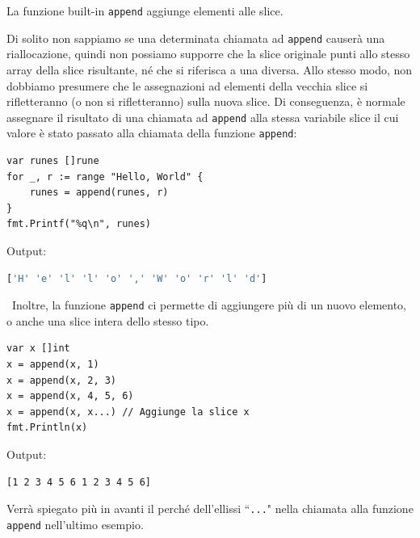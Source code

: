\documentclass[../../thesis.tex]{subfiles}
\begin{document}
    La funzione built-in \verb"append" aggiunge elementi alle slice.

    Di solito non sappiamo se una determinata chiamata ad \verb"append" causerà una riallocazione, quindi non possiamo supporre che la slice originale punti allo stesso array della slice risultante, né che si riferisca a una diversa.
    Allo stesso modo, non dobbiamo presumere che le assegnazioni ad elementi della vecchia slice si rifletteranno (o non si rifletteranno) sulla nuova slice.
    Di conseguenza, è normale assegnare il risultato di una chiamata ad \verb"append" alla stessa variabile slice il cui valore è stato passato alla chiamata della funzione \verb"append":
    \begin{lstlisting}[frame = single, label = {lst:lstlisting3-2.8}]
var runes []rune
for _, r := range "Hello, World" {
    runes = append(runes, r)
}
fmt.Printf("%q\n", runes)
    \end{lstlisting}
    Output:
    \begin{lstlisting}[language = bash, frame = L, label = {lst:lstlisting3-2.9}]
['H' 'e' 'l' 'l' 'o' ',' 'W' 'o' 'r' 'l' 'd']
    \end{lstlisting}
    \
    Inoltre, la funzione \verb"append" ci permette di aggiungere più di un nuovo elemento, o anche una slice intera dello stesso tipo.
    \begin{lstlisting}[frame = single, label = {lst:lstlisting3-2.10}]
var x []int
x = append(x, 1)
x = append(x, 2, 3)
x = append(x, 4, 5, 6)
x = append(x, x...) // Aggiunge la slice x
fmt.Println(x)
    \end{lstlisting}
    Output:
    \begin{lstlisting}[language = bash, frame = L, label = {lst:lstlisting3-2.11}]
[1 2 3 4 5 6 1 2 3 4 5 6]
    \end{lstlisting}
    Verrà spiegato più in avanti il perché dell'ellissi ``\verb"..."" nella chiamata alla funzione \verb"append" nell'ultimo esempio.
    \hfill \vspace{12pt}
\end{document}
